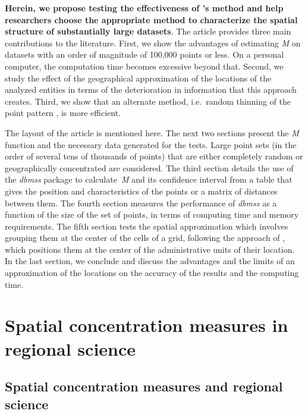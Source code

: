 \documentclass[fleqn,10pt]{latex/stylish_article} %
\begin{document}
\textbf{Herein, we propose testing the effectiveness of \citet{Tidu2023}'s method and help researchers choose the appropriate method to characterize the spatial structure of substantially large datasets}.
The article provides three main contributions to the literature.
First, we show the advantages of estimating \emph{M} on datasets with an order of magnitude of 100,000 points or less.
On a personal computer, the computation time becomes excessive beyond that.
Second, we study the effect of the geographical approximation of the locations of the analyzed entities in terms of the deterioration in information that this approach creates.
Third, we show that an alternate method, i.e.~random thinning of the point pattern \citep{Sweeney2005, Arbia2017}, is more efficient.

The layout of the article is mentioned here.
The next two sections present the \emph{M} function and the necessary data generated for the tests.
Large point sets (in the order of several tens of thousands of points) that are either completely random or geographically concentrated are considered.
The third section details the use of the \emph{dbmss} package to calculate~\emph{M} and its confidence interval from a table that gives the position and characteristics of the points or a matrix of distances between them.
The fourth section measures the performance of \emph{dbmss} as a function of the size of the set of points, in terms of computing time and memory requirements.
The fifth section tests the spatial approximation which involves grouping them at the center of the cells of a grid, following the approach of \citet{Tidu2023}, which positions them at the center of the administrative units of their location.
In the last section, we conclude and discuss the advantages and the limits of an approximation of the locations on the accuracy of the results and the computing time.

\section{Spatial concentration measures in regional science}\label{spatial-concentration-measures-in-regional-science}

\subsection{Spatial concentration measures and regional science}\label{spatial-concentration-measures-and-regional-science}
\end{document}
